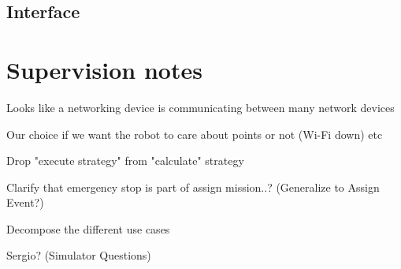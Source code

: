 \subsection{Interface}









\section*{Supervision notes}
Looks like a networking device is communicating between many network devices

Our choice if we want the robot to care about points or not (Wi-Fi down) etc

Drop "execute strategy" from "calculate" strategy

Clarify that emergency stop is part of assign mission..? (Generalize to Assign Event?)

Decompose the different use cases

Sergio? (Simulator Questions)
